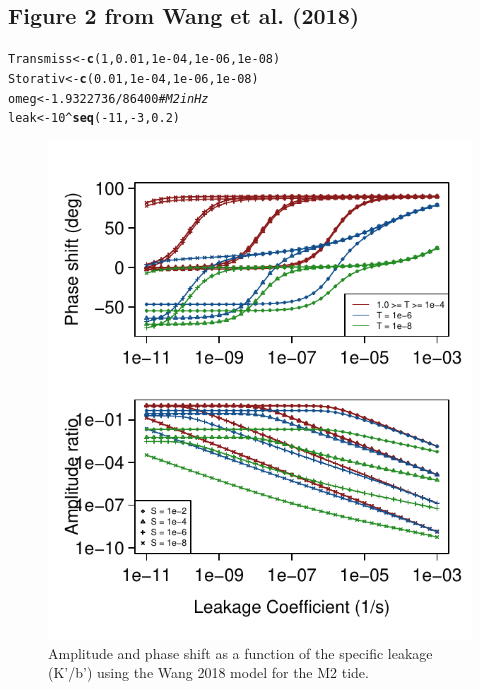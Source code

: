 \documentclass[12pt]{article}\usepackage[]{graphicx}\usepackage[]{color}
\makeatletter
\def\maxwidth{ %
  \ifdim\Gin@nat@width>\linewidth
    \linewidth
  \else
    \Gin@nat@width
  \fi
}
\newcommand{\hlnum}[1]{\textcolor[rgb]{0.686,0.059,0.569}{#1}}%
\newcommand{\hlcom}[1]{\textcolor[rgb]{0.678,0.584,0.686}{\textit{#1}}}%
\newcommand{\hlopt}[1]{\textcolor[rgb]{0,0,0}{#1}}%
\newcommand{\hlstd}[1]{\textcolor[rgb]{0.345,0.345,0.345}{#1}}%
\newcommand{\hlkwb}[1]{\textcolor[rgb]{0.69,0.353,0.396}{#1}}%
\newcommand{\hlkwd}[1]{\textcolor[rgb]{0.737,0.353,0.396}{\textbf{#1}}}%
\newenvironment{kframe}{%
 \def\at@end@of@kframe{}%
 \ifinner\ifhmode%
  \def\at@end@of@kframe{\end{minipage}}%
  \begin{minipage}{\columnwidth}%
 \fi\fi%
 \def\FrameCommand##1{\hskip\@totalleftmargin \hskip-\fboxsep
 \colorbox{shadecolor}{##1}\hskip-\fboxsep
     \hskip-\linewidth \hskip-\@totalleftmargin \hskip\columnwidth}%
 \MakeFramed {\advance\hsize-\width
   \@totalleftmargin\z@ \linewidth\hsize
   \@setminipage}}%
 {\par\unskip\endMakeFramed%
 \at@end@of@kframe}
\newenvironment{knitrout}{}{} %
\makeatother
\begin{document}
\clearpage
\subsection{Figure 2 from Wang et al. (2018)}

\begin{knitrout}\small
{}\color{fgcolor}\begin{kframe}
\begin{alltt}
\hlstd{Transmiss} \hlkwb{<-} \hlkwd{c}\hlstd{(}\hlnum{1}\hlstd{,} \hlnum{0.01}\hlstd{,} \hlnum{1e-04}\hlstd{,} \hlnum{1e-06}\hlstd{,} \hlnum{1e-08}\hlstd{)}
\hlstd{Storativ} \hlkwb{<-} \hlkwd{c}\hlstd{(}\hlnum{0.01}\hlstd{,} \hlnum{1e-04}\hlstd{,} \hlnum{1e-06}\hlstd{,} \hlnum{1e-08}\hlstd{)}
\hlstd{omeg} \hlkwb{<-} \hlnum{1.9322736}\hlopt{/}\hlnum{86400}  \hlcom{# M2 in Hz}
\hlstd{leak} \hlkwb{<-} \hlnum{10}\hlopt{^}\hlkwd{seq}\hlstd{(}\hlopt{-}\hlnum{11}\hlstd{,} \hlopt{-}\hlnum{3}\hlstd{,} \hlnum{0.2}\hlstd{)}
\end{alltt}
\end{kframe}
\end{knitrout}

\begin{figure}[htb!]
\begin{center}
\begin{knitrout}\small
{}\color{fgcolor}
\includegraphics[width=\maxwidth]{figure/WANGRESPFIG-1} 

\end{knitrout}
\caption{Amplitude and phase shift as a function of the specific leakage (K'/b') using the Wang 2018 model for the M2 tide.}
\label{fig:owrsp-wang}
\end{center}
\end{figure}
\end{document}
